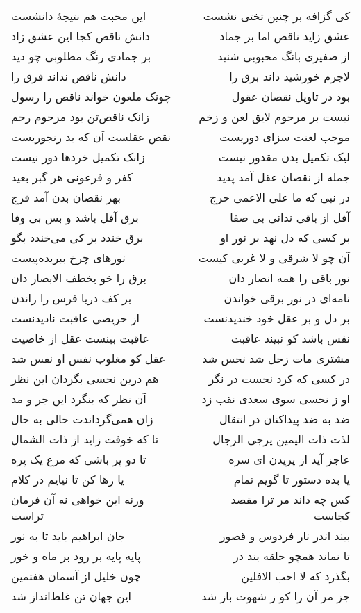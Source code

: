 \begin{center}
\begin{longtable}{l p{0.5cm} r}
این محبت هم نتیجهٔ دانشست
&&
کی گزافه بر چنین تختی نشست
\\
دانش ناقص کجا این عشق زاد
&&
عشق زاید ناقص اما بر جماد
\\
بر جمادی رنگ مطلوبی چو دید
&&
از صفیری بانگ محبوبی شنید
\\
دانش ناقص نداند فرق را
&&
لاجرم خورشید داند برق را
\\
چونک ملعون خواند ناقص را رسول
&&
بود در تاویل نقصان عقول
\\
زانک ناقص‌تن بود مرحوم رحم
&&
نیست بر مرحوم لایق لعن و زخم
\\
نقص عقلست آن که بد رنجوریست
&&
موجب لعنت سزای دوریست
\\
زانک تکمیل خردها دور نیست
&&
لیک تکمیل بدن مقدور نیست
\\
کفر و فرعونی هر گبر بعید
&&
جمله از نقصان عقل آمد پدید
\\
بهر نقصان بدن آمد فرج
&&
در نبی که ما علی الاعمی حرج
\\
برق آفل باشد و بس بی وفا
&&
آفل از باقی ندانی بی صفا
\\
برق خندد بر کی می‌خندد بگو
&&
بر کسی که دل نهد بر نور او
\\
نورهای چرخ ببریده‌پیست
&&
آن چو لا شرقی و لا غربی کیست
\\
برق را خو یخطف الابصار دان
&&
نور باقی را همه انصار دان
\\
بر کف دریا فرس را راندن
&&
نامه‌ای در نور برقی خواندن
\\
از حریصی عاقبت نادیدنست
&&
بر دل و بر عقل خود خندیدنست
\\
عاقبت بینست عقل از خاصیت
&&
نفس باشد کو نبیند عاقبت
\\
عقل کو مغلوب نفس او نفس شد
&&
مشتری مات زحل شد نحس شد
\\
هم درین نحسی بگردان این نظر
&&
در کسی که کرد نحست در نگر
\\
آن نظر که بنگرد این جر و مد
&&
او ز نحسی سوی سعدی نقب زد
\\
زان همی‌گرداندت حالی به حال
&&
ضد به ضد پیداکنان در انتقال
\\
تا که خوفت زاید از ذات الشمال
&&
لذت ذات الیمین یرجی الرجال
\\
تا دو پر باشی که مرغ یک پره
&&
عاجز آید از پریدن ای سره
\\
یا رها کن تا نیایم در کلام
&&
یا بده دستور تا گویم تمام
\\
ورنه این خواهی نه آن فرمان تراست
&&
کس چه داند مر ترا مقصد کجاست
\\
جان ابراهیم باید تا به نور
&&
بیند اندر نار فردوس و قصور
\\
پایه پایه بر رود بر ماه و خور
&&
تا نماند همچو حلقه بند در
\\
چون خلیل از آسمان هفتمین
&&
بگذرد که لا احب الافلین
\\
این جهان تن غلط‌انداز شد
&&
جز مر آن را کو ز شهوت باز شد
\\
\end{longtable}
\end{center}

